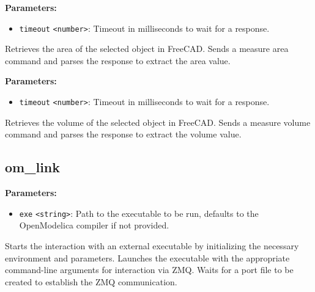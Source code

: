 \documentclass[12pt,a4paper]{article}
\begin{document}
\vspace{5mm}
\noindent {}


\noindent \textbf{Parameters:}
\begin{itemize}
  \item \texttt{timeout} \texttt{<number>}: Timeout in milliseconds to wait for a response.
\end{itemize}

\noindent Retrieves the area of the selected object in FreeCAD.
Sends a measure area command and parses the response to extract the area value.

\vspace{5mm}
\noindent {}


\noindent \textbf{Parameters:}
\begin{itemize}
  \item \texttt{timeout} \texttt{<number>}: Timeout in milliseconds to wait for a response.
\end{itemize}

\noindent Retrieves the volume of the selected object in FreeCAD.
Sends a measure volume command and parses the response to extract the volume value.


\subsection{om\_link}
\vspace{5mm}
\noindent {}


\noindent \textbf{Parameters:}
\begin{itemize}
  \item \texttt{exe} \texttt{<string>}: Path to the executable to be run, defaults to the OpenModelica compiler if not provided.
\end{itemize}

\noindent Starts the interaction with an external executable by initializing the necessary environment and parameters.
Launches the executable with the appropriate command-line arguments for interaction via ZMQ.
Waits for a port file to be created to establish the ZMQ communication.
\end{document}

